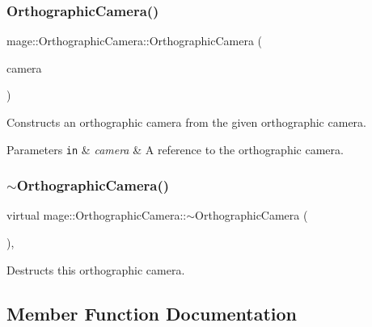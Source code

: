 \subsubsection{\texorpdfstring{Orthographic\+Camera()}{OrthographicCamera()}\hspace{0.1cm}{\footnotesize\ttfamily [2/2]}}
{\footnotesize\ttfamily mage\+::\+Orthographic\+Camera\+::\+Orthographic\+Camera (\begin{DoxyParamCaption}\item[{const \hyperlink{classmage_1_1_orthographic_camera}{Orthographic\+Camera} \&}]{camera }\end{DoxyParamCaption})\hspace{0.3cm}{\ttfamily [private]}}

Constructs an orthographic camera from the given orthographic camera.


\begin{DoxyParams}[1]{Parameters}
\mbox{\tt in}  & {\em camera} & A reference to the orthographic camera. \\
\hline
\end{DoxyParams}
\hypertarget{classmage_1_1_orthographic_camera_a2ab3dbd44e2a6fad6a88e3733cc22ac9}{}\label{classmage_1_1_orthographic_camera_a2ab3dbd44e2a6fad6a88e3733cc22ac9} 
\subsubsection{\texorpdfstring{$\sim$\+Orthographic\+Camera()}{~OrthographicCamera()}}
{\footnotesize\ttfamily virtual mage\+::\+Orthographic\+Camera\+::$\sim$\+Orthographic\+Camera (\begin{DoxyParamCaption}{ }\end{DoxyParamCaption})\hspace{0.3cm}{\ttfamily [private]}, {\ttfamily [virtual]}}

Destructs this orthographic camera. 

\subsection{Member Function Documentation}
\hypertarget{classmage_1_1_orthographic_camera_a3fc2e5cfe7283670937de2a4841a5428}{}\label{classmage_1_1_orthographic_camera_a3fc2e5cfe7283670937de2a4841a5428} 
